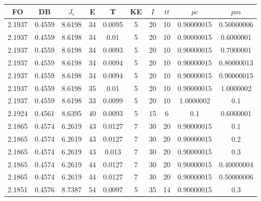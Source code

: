 \begin{table}[h!]
    \footnotesize
    \begin{center}
        \begin{tabular}{|c|c|c|c|c|c|c|c|c|c|}
        \hline
            {\bf FO} & {\bf DB} & $J_e$ & {\bf E} & {\bf T} & {\bf KE} & $I$ & $tt$ & $pc$ & $pm$ \\
        \hline
        \hline
            2.1937 & 0.4559  & 8.6198 & 34 & 0.0095 & 5 & 20 & 10 & 0.90000015 & 0.50000006\\
        \hline
        \hline
            2.1937 & 0.4559  & 8.6198 & 34 & 0.01 & 5 & 20 & 10 & 0.90000015 & 0.6000001\\
        \hline
        \hline
            2.1937 & 0.4559  & 8.6198 & 34 & 0.0093 & 5 & 20 & 10 & 0.90000015 & 0.7000001\\
        \hline
        \hline
            2.1937 & 0.4559  & 8.6198 & 34 & 0.0094 & 5 & 20 & 10 & 0.90000015 & 0.80000013\\
        \hline
        \hline
            2.1937 & 0.4559  & 8.6198 & 34 & 0.0094 & 5 & 20 & 10 & 0.90000015 & 0.90000015\\
        \hline
        \hline
            2.1937 & 0.4559  & 8.6198 & 35 & 0.01 & 5 & 20 & 10 & 0.90000015 & 1.0000002\\
        \hline
        \hline
            2.1937 & 0.4559  & 8.6198 & 33 & 0.0099 & 5 & 20 & 10 & 1.0000002 & 0.1\\
        \hline
        \hline
            2.1924 & 0.4561  & 8.6395 & 40 & 0.0093 & 5 & 15 & 6 & 0.1 & 0.6000001\\
        \hline
        \hline
            2.1865 & 0.4574  & 6.2619 & 43 & 0.0127 & 7 & 30 & 20 & 0.90000015 & 0.1\\
        \hline
        \hline
            2.1865 & 0.4574  & 6.2619 & 43 & 0.0127 & 7 & 30 & 20 & 0.90000015 & 0.2\\
        \hline
        \hline
            2.1865 & 0.4574  & 6.2619 & 43 & 0.013 & 7 & 30 & 20 & 0.90000015 & 0.3\\
        \hline
        \hline
            2.1865 & 0.4574  & 6.2619 & 44 & 0.0127 & 7 & 30 & 20 & 0.90000015 & 0.40000004\\
        \hline
        \hline
            2.1865 & 0.4574  & 6.2619 & 44 & 0.0127 & 7 & 30 & 20 & 0.90000015 & 0.50000006\\
        \hline
        \hline
            2.1851 & 0.4576  & 8.7387 & 54 & 0.0097 & 5 & 35 & 14 & 0.90000015 & 0.3\\

\end{tabular}
\end{center}
\end{table}
